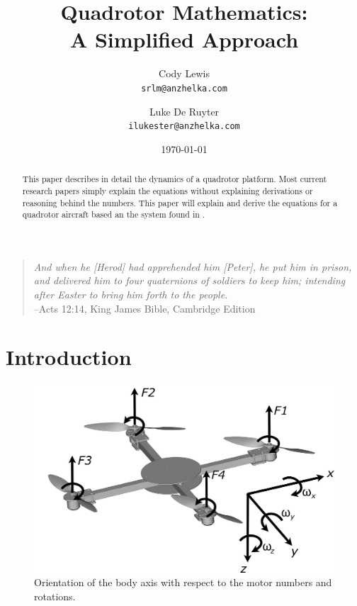 \documentclass{article}
\numberwithin{equation}{section} %
\begin{document}
\title{Quadrotor Mathematics: \\ A Simplified Approach}
\author{Cody Lewis \\ \texttt{srlm@anzhelka.com} \and Luke De Ruyter \\ \texttt{ilukester@anzhelka.com} }
\date{\today}
\maketitle
\begin{verse}\textit{
And when he [Herod] had apprehended him [Peter], he put him in prison, and delivered him to four quaternions of soldiers to keep him; intending after Easter to bring him forth to the people.} \\
\hfill --Acts 12:14, King James Bible, Cambridge Edition
\end{verse}

\begin{abstract}
This paper describes in detail the dynamics of a quadrotor platform. Most current research papers simply explain the equations without explaining derivations or reasoning behind the numbers. This paper will explain and derive the equations for a quadrotor aircraft based an the system found in \cite{stingu09}.
\end{abstract}

\section{Introduction}

\begin{figure}[h!]
  \centering
	\includegraphics[scale=.05]{reference_frame_diagram.jpg}
  \caption{Orientation of the body axis with respect to the motor numbers and rotations.}
\end{figure}  
\end{document}
